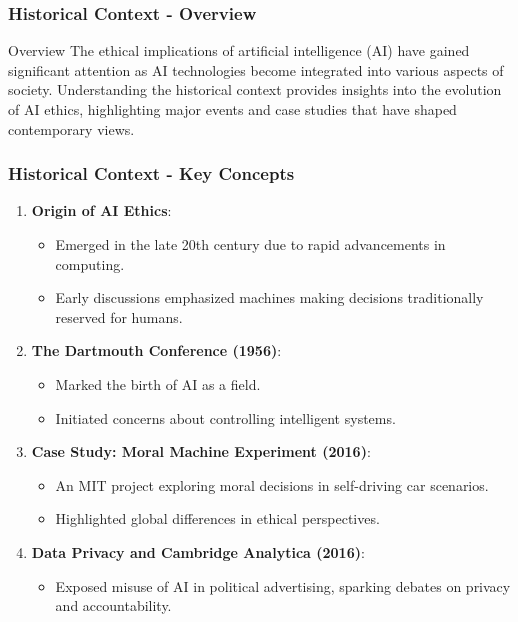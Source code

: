 \documentclass[aspectratio=169]{beamer}
\begin{document}
\begin{frame}[fragile]
    \frametitle{Historical Context - Overview}
    \begin{block}{Overview}
        The ethical implications of artificial intelligence (AI) have gained significant attention as AI technologies become integrated into various aspects of society. 
        Understanding the historical context provides insights into the evolution of AI ethics, highlighting major events and case studies that have shaped contemporary views.
    \end{block}
\end{frame}

\begin{frame}[fragile]
    \frametitle{Historical Context - Key Concepts}
    \begin{enumerate}
        \item \textbf{Origin of AI Ethics}:
            \begin{itemize}
                \item Emerged in the late 20th century due to rapid advancements in computing.
                \item Early discussions emphasized machines making decisions traditionally reserved for humans.
            \end{itemize}
        
        \item \textbf{The Dartmouth Conference (1956)}:
            \begin{itemize}
                \item Marked the birth of AI as a field.
                \item Initiated concerns about controlling intelligent systems.
            \end{itemize}
        
        \item \textbf{Case Study: Moral Machine Experiment (2016)}:
            \begin{itemize}
                \item An MIT project exploring moral decisions in self-driving car scenarios.
                \item Highlighted global differences in ethical perspectives.
            \end{itemize}
        
        \item \textbf{Data Privacy and Cambridge Analytica (2016)}:
            \begin{itemize}
                \item Exposed misuse of AI in political advertising, sparking debates on privacy and accountability.
            \end{itemize}
        

\end{enumerate}
\end{frame}
\end{document}
